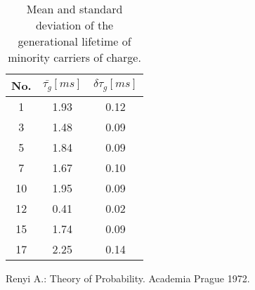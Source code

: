 \begin{table}[h!]\centering
  \begin{minipage}[c]{\myfiguresize}
    \begin{center}
      \begin{tabular}{c c c}
        No. & ${\bar{\tau_{g}}}[ms]$ & $\delta\tau_{g}[ms]$\\
        \hline
        1 & 1.93 & 0.12\\
        3 & 1.48 & 0.09\\
        5 & 1.84 & 0.09\\
        7 & 1.67 & 0.10\\
        10 & 1.95 & 0.09\\
        12 & 0.41 & 0.02\\
        15 & 1.74 & 0.09\\
        17 & 2.25 & 0.14\\
      \end{tabular}
    \end{center}
    \caption[Mean and standard deviation of generation time of life of
      minority carriers of charge]{Mean and standard deviation of the
      generational lifetime of minority carriers of
      charge.}\label{tab:7.6}
  \end{minipage}
\end{table}


\begin{thebibliography}{}
  Renyi A.: Theory of Probability. Academia Prague 1972.
\end{thebibliography}
